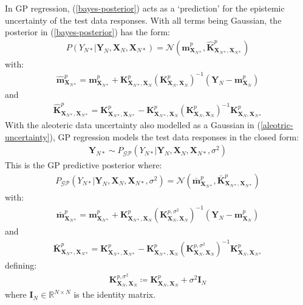 \documentclass{article}
\newcommand{\GP}{\operatorname{\mathcal{GP}}}
\numberwithin{equation}{section}
\begin{document}
In GP regression, (\ref{bayes-posterior}) acts as a `prediction' for the epistemic uncertainty of the test data responses. With all terms being Gaussian, the posterior in (\ref{bayes-posterior}) has the form:
\begin{align}
    P\left(Y_{N*} | \mathbf{Y}_{N},  \mathbf{X}_{N},  \mathbf{X}_{N*}\right)  =  \mathcal{N}\left(\hat{\mathbf{m}}^p_{\mathbf{X}_{N*}}, \hat{\mathbf{K}}^p_{\mathbf{X}_{N*}, \mathbf{X}_{N*}}\right)
    \label{gp-epistemic-posterior}
\end{align}
with:
\begin{align}
    \label{gp-epistemic-posterior-mean}
    \hat{\mathbf{m}}^p_{\mathbf{X}_{N*}} = \mathbf{m}^p_{\mathbf{X}_{N*}} + \mathbf{K}^p_{\mathbf{X}_{N*}, \mathbf{X}_N} \left(\mathbf{K}^p_{\mathbf{X}_N, \mathbf{X}_N}\right)^{-1} \left( \mathbf{Y}_N - \mathbf{m}^p_{\mathbf{X}_N}\right)
\end{align}
and
\begin{align}
    \label{gp-epistemic-posterior-covariance}
    \hat{\mathbf{K}}^p_{\mathbf{X}_{N*}, \mathbf{X}_{N*}} = \mathbf{K}^p_{\mathbf{X}_{N*}, \mathbf{X}_{N*}} - \mathbf{K}^p_{\mathbf{X}_{N*}, \mathbf{X}_N}\left(\mathbf{K}^p_{\mathbf{X}_N, \mathbf{X}_N}\right)^{-1}\mathbf{K}^p_{\mathbf{X}_N, \mathbf{X}_{N*}}
\end{align}
With the aleoteric data uncertainty also modelled as a Gaussian in (\ref{aleotric-uncertainty}), GP regression models the test data responses in the closed form:
\begin{align}
    \mathbf{Y}_{N*} \sim P_{\GP}\left(Y_{N*} \vert \mathbf{Y}_N, \mathbf{X}_N, \mathbf{X}_{N*}, \sigma^2\right)
    \label{gp-posterior}
\end{align}
This is the GP predictive posterior where:
\begin{align}
    P_{\GP}\left(Y_{N*} \vert \mathbf{Y}_N, \mathbf{X}_N, \mathbf{X}_{N*}, \sigma^2\right) = \mathcal{N}\left(\bar{\mathbf{m}}^p_{\mathbf{X}_{N*}}, \bar{\mathbf{K}}^p_{\mathbf{X}_{N*}, \mathbf{X}_{N*}}\right)
    \label{gp-posterior-normal}
\end{align}
with:
\begin{align}
    \label{gp-posterior-mean}
    \bar{\mathbf{m}}^p_{\mathbf{X}_{N*}} = \mathbf{m}^p_{\mathbf{X}_{N*}} + \mathbf{K}^p_{\mathbf{X}_{N*}, \mathbf{X}_N} \left( \mathbf{K}^{p, \sigma^2}_{\mathbf{X}_N, \mathbf{X}_N}\right)^{-1} \left( \mathbf{Y}_N - \mathbf{m}^p_{\mathbf{X}_N}\right)
\end{align}
and
\begin{align}
    \label{gp-posterior-covariance}
    \bar{\mathbf{K}}^p_{\mathbf{X}_{N*}, \mathbf{X}_{N*}} = \mathbf{K}^p_{\mathbf{X}_{N*}, \mathbf{X}_{N*}} - \mathbf{K}^p_{\mathbf{X}_{N*}, \mathbf{X}_N}\left( \mathbf{K}^{p, \sigma^2}_{\mathbf{X}_N, \mathbf{X}_N}\right)^{-1}\mathbf{K}^p_{\mathbf{X}_N, \mathbf{X}_{N*}}
\end{align}
defining:
\begin{align}
    \mathbf{K}^{p, \sigma^2}_{\mathbf{X}_N, \mathbf{X}_N} \coloneqq \mathbf{K}^p_{\mathbf{X}_N, \mathbf{X}_N} + \sigma^2 \mathbf{I}_N
    \label{gp-covariance-with-sigma}
\end{align}
where $\mathbf{I}_N \in \mathbb{R}^{N \times N}$ is the identity matrix.
\end{document}
